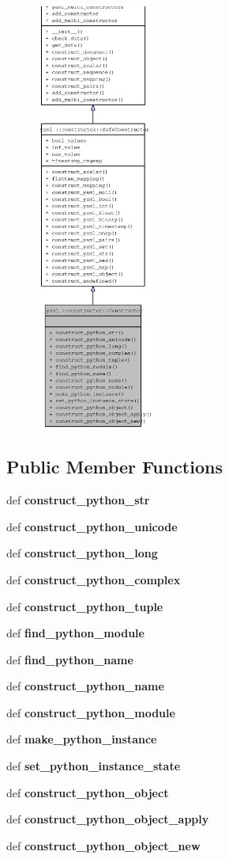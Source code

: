 \begin{figure}[H]
\begin{center}
\leavevmode
\includegraphics[height=400pt]{class__yaml___1_1constructor_1_1Constructor__coll__graph}
\end{center}
\end{figure}
\subsection*{Public Member Functions}
\begin{CompactItemize}
\item 
def {\bf construct\_\-python\_\-str}
\item 
def {\bf construct\_\-python\_\-unicode}
\item 
def {\bf construct\_\-python\_\-long}
\item 
def {\bf construct\_\-python\_\-complex}
\item 
def {\bf construct\_\-python\_\-tuple}
\item 
def {\bf find\_\-python\_\-module}
\item 
def {\bf find\_\-python\_\-name}
\item 
def {\bf construct\_\-python\_\-name}
\item 
def {\bf construct\_\-python\_\-module}
\item 
def {\bf make\_\-python\_\-instance}
\item 
def {\bf set\_\-python\_\-instance\_\-state}
\item 
def {\bf construct\_\-python\_\-object}
\item 
def {\bf construct\_\-python\_\-object\_\-apply}
\item 
def {\bf construct\_\-python\_\-object\_\-new}
\end{CompactItemize}

